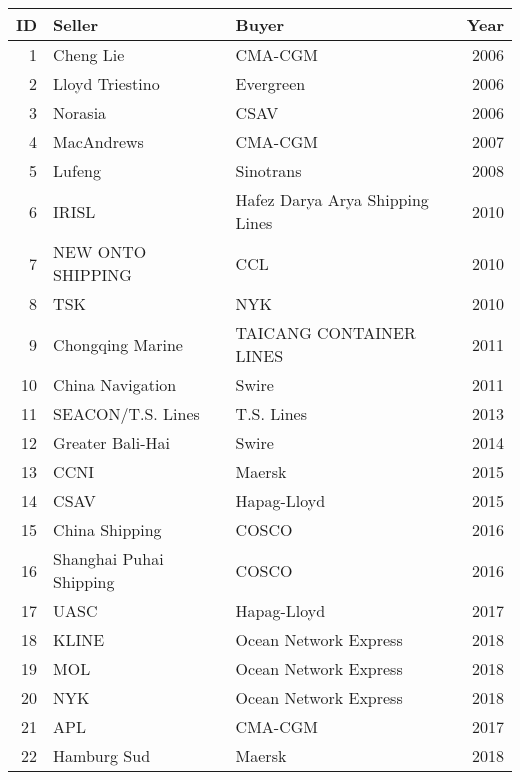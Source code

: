 
\begin{tabular}[t]{rllr}
\toprule
ID & Seller & Buyer & Year\\
\midrule
1 & Cheng Lie & CMA-CGM & 2006\\
2 & Lloyd Triestino & Evergreen & 2006\\
3 & Norasia & CSAV & 2006\\
4 & MacAndrews & CMA-CGM & 2007\\
5 & Lufeng & Sinotrans & 2008\\
6 & IRISL & Hafez Darya Arya Shipping Lines & 2010\\
7 & NEW ONTO SHIPPING & CCL & 2010\\
8 & TSK & NYK & 2010\\
9 & Chongqing Marine & TAICANG CONTAINER LINES & 2011\\
10 & China Navigation & Swire & 2011\\
11 & SEACON/T.S. Lines & T.S. Lines & 2013\\
12 & Greater Bali-Hai & Swire & 2014\\
13 & CCNI & Maersk & 2015\\
14 & CSAV & Hapag-Lloyd & 2015\\
15 & China Shipping & COSCO & 2016\\
16 & Shanghai Puhai Shipping & COSCO & 2016\\
17 & UASC & Hapag-Lloyd & 2017\\
18 & KLINE & Ocean Network Express & 2018\\
19 & MOL & Ocean Network Express & 2018\\
20 & NYK & Ocean Network Express & 2018\\
21 & APL & CMA-CGM & 2017\\
22 & Hamburg Sud & Maersk & 2018\\
\bottomrule
\end{tabular}
